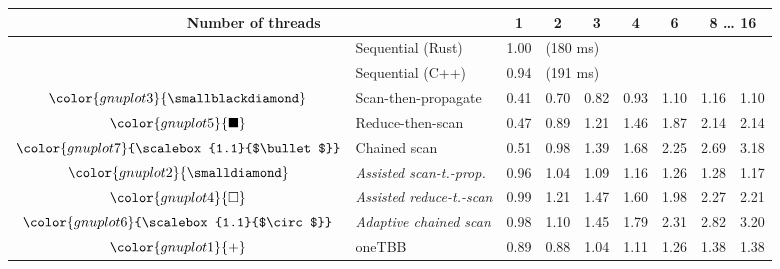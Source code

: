 \begin{tabular}{clrrrrrrr}
\toprule
\multicolumn{2}{c}{\textbf{Number of threads}} & \multicolumn{1}{c}{\textbf{ 1 }} & \multicolumn{1}{c}{\textbf{ 2 }} & \multicolumn{1}{c}{\textbf{ 3 }} & \multicolumn{1}{c}{\textbf{ 4 }} & \multicolumn{1}{c}{\textbf{ 6 }} & \multicolumn{2}{c}{\textbf{ 8 } \dots \textbf{ 16 }} \\
\midrule
& Sequential (Rust) & \multicolumn{1}{r}{ 1.00 } & \multicolumn{ 6 }{l}{(180 ms)} \\
& Sequential (C++) & \multicolumn{1}{r}{ 0.94 } & \multicolumn{ 6 }{l}{(191 ms)} \\
\rowcolor{gnuplot3!10}$\color{gnuplot3}{\smallblackdiamond}$ & Scan-then-propagate & \cellcolor{gnuplot3!10} 0.41 & \cellcolor{gnuplot3!10} 0.70 & \cellcolor{gnuplot3!10} 0.82 & \cellcolor{gnuplot3!10} 0.93 & \cellcolor{gnuplot3!10} 1.10 & \cellcolor{gnuplot3!10} 1.16 & \cellcolor{gnuplot3!10} 1.10 \\
\rowcolor{gnuplot5!10}$\color{gnuplot5}{\blacksquare}$ & Reduce-then-scan & \cellcolor{gnuplot5!10} 0.47 & \cellcolor{gnuplot5!10} 0.89 & \cellcolor{gnuplot5!10} 1.21 & \cellcolor{gnuplot5!10} 1.46 & \cellcolor{gnuplot5!10} 1.87 & \cellcolor{gnuplot5!10} 2.14 & \cellcolor{gnuplot5!10} 2.14 \\
\rowcolor{gnuplot7!10}$\color{gnuplot7}{\scalebox{1.1}{$\bullet$}}$ & Chained scan & \cellcolor{gnuplot7!10} 0.51 & \cellcolor{gnuplot7!10} 0.98 & \cellcolor{gnuplot7!10} 1.39 & \cellcolor{gnuplot7!10} 1.68 & \cellcolor{gnuplot7!10} 2.25 & \cellcolor{gnuplot7!10} 2.69 & \cellcolor{gnuplot7!10} 3.18 \\
\rowcolor{gnuplot2!30}$\color{gnuplot2}{\smalldiamond}$ & \textit{Assisted scan-t.-prop.} & \cellcolor{gnuplot2!30} 0.96 & \cellcolor{gnuplot2!30} 1.04 & \cellcolor{gnuplot2!30} 1.09 & \cellcolor{gnuplot2!30} 1.16 & \cellcolor{gnuplot2!30} 1.26 & \cellcolor{gnuplot2!30} 1.28 & \cellcolor{gnuplot2!30} 1.17 \\
\rowcolor{gnuplot4!30}$\color{gnuplot4}{\square}$ & \textit{Assisted reduce-t.-scan} & \cellcolor{gnuplot4!30} 0.99 & \cellcolor{gnuplot4!30} 1.21 & \cellcolor{gnuplot4!30} 1.47 & \cellcolor{gnuplot4!30} 1.60 & \cellcolor{gnuplot4!30} 1.98 & \cellcolor{gnuplot4!30} 2.27 & \cellcolor{gnuplot4!30} 2.21 \\
\rowcolor{gnuplot6!30}$\color{gnuplot6}{\scalebox{1.1}{$\circ$}}$ & \textit{Adaptive chained scan} & \cellcolor{gnuplot6!30} 0.98 & \cellcolor{gnuplot6!30} 1.10 & \cellcolor{gnuplot6!30} 1.45 & \cellcolor{gnuplot6!30} 1.79 & \cellcolor{gnuplot6!30} 2.31 & \cellcolor{gnuplot6!30} 2.82 & \cellcolor{gnuplot6!30} 3.20 \\
\rowcolor{gnuplot1!10}$\color{gnuplot1}{+}$ & oneTBB & \cellcolor{gnuplot1!10} 0.89 & \cellcolor{gnuplot1!10} 0.88 & \cellcolor{gnuplot1!10} 1.04 & \cellcolor{gnuplot1!10} 1.11 & \cellcolor{gnuplot1!10} 1.26 & \cellcolor{gnuplot1!10} 1.38 & \cellcolor{gnuplot1!10} 1.38 \\
\bottomrule
\end{tabular}
